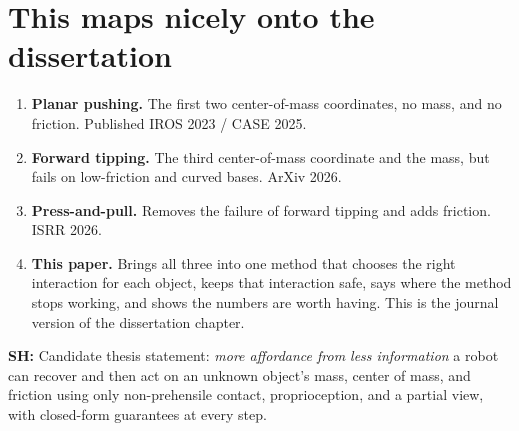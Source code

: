 \documentclass[10pt, conference]{IEEEtran}
\newcommand{\sh}[1]{\textcolor{orange!90!black}{\textbf{SH:} #1}}
\begin{document}

\section{This maps nicely onto the dissertation}

\begin{enumerate}
  \item \textbf{Planar pushing.} The first two center-of-mass coordinates, no mass, and no friction. Published IROS 2023 / CASE 2025.
  \item \textbf{Forward tipping.} The third center-of-mass coordinate and the mass, but fails on low-friction and curved bases. ArXiv 2026.
  \item \textbf{Press-and-pull.} Removes the failure of forward tipping and adds friction. ISRR 2026.
  \item \textbf{This paper.} Brings all three into one method that chooses the right interaction for each object, keeps that interaction safe, says where the method stops working, and shows the numbers are worth having. This is the journal version of the dissertation chapter.
\end{enumerate}

\sh{Candidate thesis statement:} \emph{more affordance from less
information} a robot can recover and then act on an unknown object's mass, center of mass, and friction using only non-prehensile contact, proprioception, and a partial view, with closed-form guarantees at every step.
\end{document}
